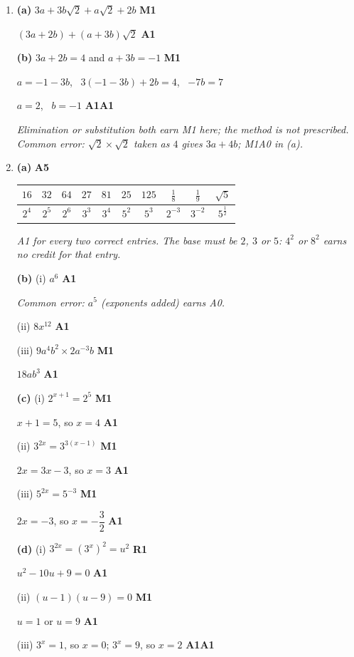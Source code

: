 \documentclass[12pt, twoside]{article}
\begin{document}
\begin{enumerate}[itemsep=0.3cm]
\bigskip \hrule \bigskip

\item[4.] [Maximum mark: 5]

\textbf{(a)} $3a + 3b\sqrt{2} + a\sqrt{2} + 2b$ \hfill \textbf{M1}

$(3a + 2b) + (a + 3b)\sqrt{2}$ \hfill \textbf{A1}

\textbf{(b)} $3a + 2b = 4$ and $a + 3b = -1$ \hfill \textbf{M1}

$a = -1 - 3b$, \ $3(-1 - 3b) + 2b = 4$, \ $-7b = 7$

$a = 2$, \ $b = -1$ \hfill \textbf{A1A1}

\emph{Elimination or substitution both earn M1 here; the method is not
prescribed. Common error: $\sqrt{2} \times \sqrt{2}$ taken as $4$ gives
$3a + 4b$; M1A0 in (a).}

\newpage

\item[5.] [Maximum mark: 21]

\textbf{(a)} \hfill \textbf{A5}

\begin{tabular}{|c|c|c|c|c|c|c|c|c|c|}
\hline
$16$ & $32$ & $64$ & $27$ & $81$ & $25$ & $125$ & $\frac{1}{8}$ & $\frac{1}{9}$ & $\sqrt{5}$ \\
\hline
$2^{4}$ & $2^{5}$ & $2^{6}$ & $3^{3}$ & $3^{4}$ & $5^{2}$ & $5^{3}$ & $2^{-3}$ & $3^{-2}$ & $5^{\frac{1}{2}}$ \\
\hline
\end{tabular}

\emph{A1 for every two correct entries. The base must be $2$, $3$ or
$5$: $4^{2}$ or $8^{2}$ earns no credit for that entry.}

\textbf{(b)} (i) $a^{6}$ \hfill \textbf{A1}

\emph{Common error: $a^{5}$ (exponents added) earns A0.}

(ii) $8x^{12}$ \hfill \textbf{A1}

(iii) $9a^{4}b^{2} \times 2a^{-3}b$ \hfill \textbf{M1}

$18ab^{3}$ \hfill \textbf{A1}

\textbf{(c)} (i) $2^{x + 1} = 2^{5}$ \hfill \textbf{M1}

$x + 1 = 5$, so $x = 4$ \hfill \textbf{A1}

(ii) $3^{2x} = 3^{3(x - 1)}$ \hfill \textbf{M1}

$2x = 3x - 3$, so $x = 3$ \hfill \textbf{A1}

(iii) $5^{2x} = 5^{-3}$ \hfill \textbf{M1}

$2x = -3$, so $x = -\dfrac{3}{2}$ \hfill \textbf{A1}

\textbf{(d)} (i) $3^{2x} = \left(3^{x}\right)^{2} = u^{2}$ \hfill \textbf{R1}

$u^{2} - 10u + 9 = 0$ \hfill \textbf{A1}

(ii) $(u - 1)(u - 9) = 0$ \hfill \textbf{M1}

$u = 1$ or $u = 9$ \hfill \textbf{A1}

(iii) $3^{x} = 1$, so $x = 0$; \quad $3^{x} = 9$, so $x = 2$
\hfill \textbf{A1A1}

\end{enumerate}
\end{document}
